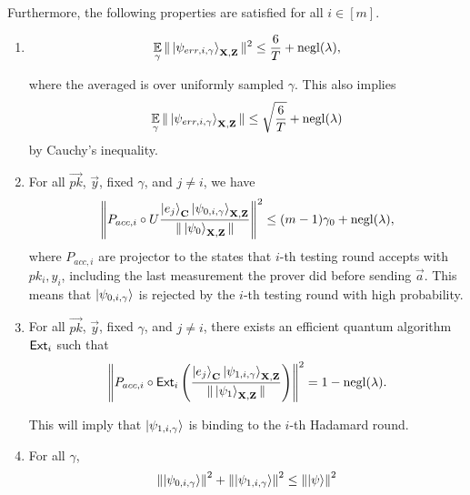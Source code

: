 \begin{lemma}
	Furthermore, the following properties are satisfied for all $i\in[m]$.
	\begin{enumerate}
		\item \label{property:partition-err}  $$\operatorname*{\mathbb{E}}_{\gamma}\|\ket{\psi_{err,i,\gamma}}_{\mathbf{X},\mathbf{Z}}\|^2 \leq \frac{6}{T}+\operatorname{negl}(\lambda),$$

			where the averaged is over uniformly sampled $\gamma$. This also implies
			\begin{align}
				\operatorname*{\mathbb{E}}_{\gamma}\|\ket{\psi_{err,i,\gamma}}_{\mathbf{X},\mathbf{Z}}\| \leq \sqrt{\frac{6}{T}}+\operatorname{negl}(\lambda)
			\end{align}
			by Cauchy's inequality.

		\item \label{property:partition-testing}
			For all $\vec{pk}$, $\vec{y}$, fixed $\gamma$, and  $j\neq i$, we have
			\begin{align}
				\left\lVert P_{acc, i} \circ U\frac{\ket{e_j}_{\mathbf{C}}\ket{\psi_{0,i,\gamma}}_{\mathbf{X},\mathbf{Z}}}{\|\ket{\psi_0}_{\mathbf{X},\mathbf{Z}}\|}\right\rVert^2 \leq (m-1)\gamma_0+\operatorname{negl}(\lambda),
			\end{align}
			where $P_{acc, i}$ are projector to the states that $i$-th testing round accepts with $pk_i,y_i$, including the last measurement the prover did before sending $\vec{a}$.  This means that $\ket{\psi_{0,i,\gamma}}$ is rejected by the $i$-th testing round with high probability.
		\item \label{property:partition-binding}
			For all $\vec{pk}$, $\vec{y}$, fixed $\gamma$, and $j\neq i$, there exists an efficient quantum algorithm $\mathsf{Ext}_i$ such that
			\begin{align}
				\left\lVert P_{acc, i} \circ \mathsf{Ext}_i\left(\frac{\ket{e_j}_{\mathbf{C}}\ket{\psi_{1,i,\gamma}}_{\mathbf{X},\mathbf{Z}}}{\|\ket{\psi_1}_{\mathbf{X},\mathbf{Z}}\|}\right)\right\rVert^2 =1-\operatorname{negl}(\lambda).
			\end{align}

			This will imply that $\ket{\psi_{1,i,\gamma}}$ is binding to the $i$-th Hadamard round.

		\item \label{property-partition-norm-sum}
			For all $\gamma$,
			\begin{align}
				\left\lVert\ket{\psi_{0,i,\gamma}}\right\rVert^2+ \left\lVert\ket{\psi_{1,i,\gamma}}\right\rVert^2 \leq  \left\lVert\ket{\psi}\right\rVert^2
			\end{align}
	\end{enumerate}
\end{lemma}


